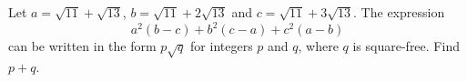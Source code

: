 Let $a=\sqrt{11}+\sqrt{13}$, $b=\sqrt{11}+2\sqrt{13}$ and $c=\sqrt{11}+3\sqrt{13}$. The expression
\[a^2(b-c)+b^2(c-a)+c^2(a-b)\]
can be written in the form $p\sqrt q$ for integers $p$ and $q$, where $q$ is square-free. Find $p+q$.
